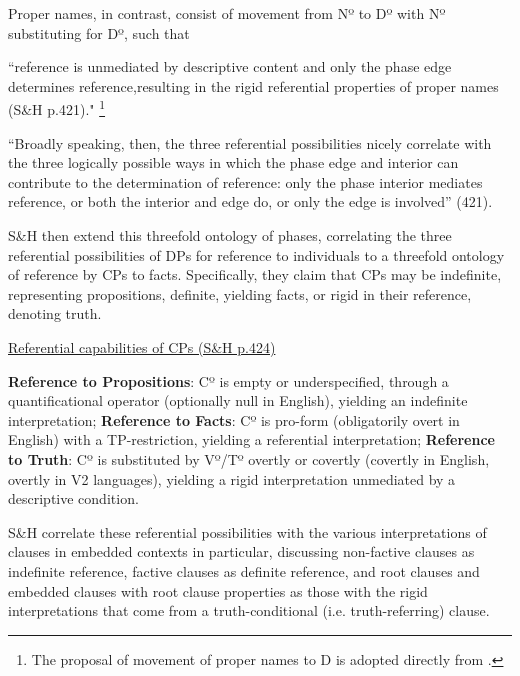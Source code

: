\documentclass[output=paper
,modfonts
,nonflat
]{langsci/langscibook}
\begin{document}
Proper names, in contrast, consist of movement from Nº to Dº with Nº substituting for Dº, such that 

\begin{displayquote}

\begin{small}

``reference is unmediated by descriptive content and only the phase edge determines reference,resulting in the rigid referential properties of proper names (S\&H p.421)." \footnote{The proposal of movement of proper names to D is adopted directly from \citet{Longobardi:1994,Longobardi:2005}.}  

``Broadly speaking, then, the three referential possibilities nicely correlate with the three logically possible ways in which the phase edge and interior can contribute to the determination of reference: only the phase interior mediates reference, or both the interior and edge do, or only the edge is involved'' (421).

\end{small}

\end{displayquote}



S\&H then extend this threefold ontology of phases, correlating the three referential possibilities of DPs for reference to individuals to a threefold ontology of reference by CPs to facts. Specifically, they claim that CPs may be indefinite, representing propositions, definite, yielding facts, or rigid in their reference, denoting truth. 

\ea \underline{Referential capabilities of CPs (S\&H p.424)} \\

\begin{xlist}
\ex \textbf{Reference to Propositions}: Cº is empty or underspecified, through a quantificational operator (optionally null in English), yielding an indefinite interpretation; 
\ex \textbf{Reference to Facts}: Cº is pro-form (obligatorily overt in English) with a TP-restriction, yielding a referential interpretation;
\ex \textbf{Reference to Truth}: Cº is substituted by Vº/Tº overtly or covertly (covertly in English, overtly in V2 languages), yielding a rigid interpretation unmediated by a descriptive condition.
\end{xlist}
\z

S\&H correlate these referential possibilities with the various interpretations of clauses in embedded contexts in particular, discussing non-factive clauses as indefinite reference, factive clauses as definite reference, and root clauses and embedded clauses with root clause properties as those with the rigid interpretations that come from a truth-conditional (i.e. truth-referring) clause. 
\end{document}
